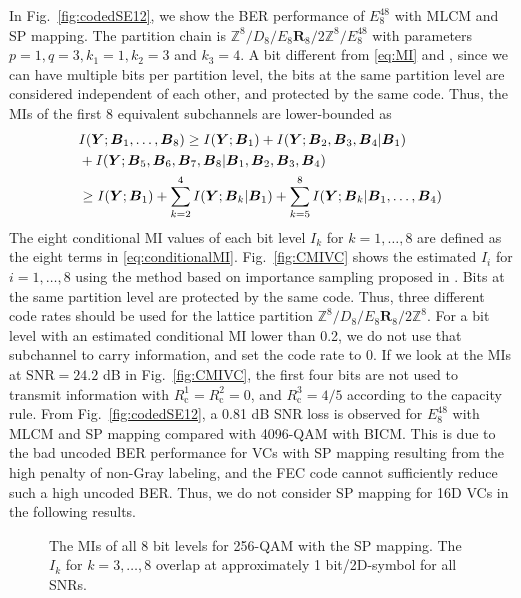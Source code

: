 \documentclass[journal]{IEEEtran}
\newcommand{\Z}{\mathbb{Z}}
\newcommand{\bB}{\boldsymbol{B}}
\newcommand{\bR}{\boldsymbol{R}}
\newcommand{\bY}{\boldsymbol{Y}}
\newcommand{\Rc}{R_\mathrm{c}}
\begin{document}
In Fig.~\ref{fig:codedSE12}, we show the BER performance of $E_8^{48}$ with MLCM and SP mapping. The partition chain is $\Z^8/D_8/E_8\bR_8/2\Z^8/E_8^{48}$ with parameters $p=1, q=3, k_1=1, k_2=3$ and $k_3=4$. A bit different from \eqref{eq:MI} and \cite{wachsmann99}, since we can have multiple bits per partition level, the bits at the same partition level are considered independent of each other, and protected by the same code. Thus, the MIs of the first 8 equivalent subchannels are lower-bounded as
\begin{align} 
&I(\bY;\bB_1,\ldots,\bB_8)\geq I(\bY;\bB_1)+ I(\bY;\bB_2,\bB_3,\bB_4|\bB_1)\notag\\&+I(\bY;\bB_5,\bB_6,\bB_7,\bB_8|\bB_1,\bB_2,\bB_3,\bB_4)\\&\geq I(\bY;\bB_1)+\sum_{k=2}^4 I(\bY;\bB_k|\bB_1)+\sum_{k=5}^8 I(\bY;\bB_k|\bB_1,\dots,\bB_4)
\label{eq:conditionalMI}
\end{align}
The eight conditional MI values of each bit level $I_k$ for $k=1,\ldots,8$ are defined as the eight terms in \eqref{eq:conditionalMI}. Fig.~\ref{fig:CMIVC} shows the estimated $I_i$ for $i=1,\ldots,8$ using the method based on importance sampling proposed in \cite{ourTC,ourjlt}. Bits at the same partition level are protected by the same code. Thus, three different code rates should be used for the lattice partition $\Z^8/D_8/E_8\bR_8/2\Z^8$. For a bit level with an estimated conditional MI lower than 0.2, we do not use that subchannel to carry information, and set the code rate to 0. If we look at the MIs at $\text{SNR}=24.2$ dB in Fig.~\ref{fig:CMIVC}, the first four bits are not used to transmit information with $\Rc^1=\Rc^2=0$, and $\Rc^3=4/5$ according to the capacity rule. From Fig.~\ref{fig:codedSE12}, a 0.81 dB SNR loss is observed for $E_8^{48}$ with MLCM and SP mapping compared with 4096-QAM with BICM. This is due to the bad uncoded BER performance for VCs with SP mapping resulting from the high penalty of non-Gray labeling, and the FEC code cannot sufficiently reduce such a high uncoded BER. Thus, we do not consider SP mapping for 16D VCs in the following results.
\begin{figure}
    \centering
    
    \caption{The MIs of all 8 bit levels for 256-QAM with the SP mapping. The $I_k$ for $k=3,\ldots,8$ overlap at approximately 1 bit/2D-symbol for all SNRs.}
    \label{fig:CMIQAM}
\end{figure}
\end{document}

